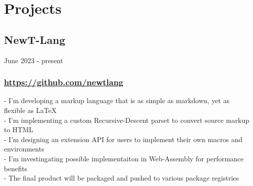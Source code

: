 \newpage

\section{Projects}


\subsection{NewT-Lang} June 2023 - present \\
\subsubsection{\href{https://github.com/newtlang}{https://github.com/newtlang}}
-\:  I'm developing a markup language that is as simple as markdown, yet as flexible as \LaTeX \\
-\:  I'm implementing a custom Recursive-Descent parset to convert source markup to HTML \\ 
-\:  I'm designing an extension API for users to implement their own macros and environments \\ 
-\:  I'm investingating possible implementaiton in Web-Assembly for performance benefits \\ 
-\:  The final product will be packaged and pushed to various package registries \\ 


